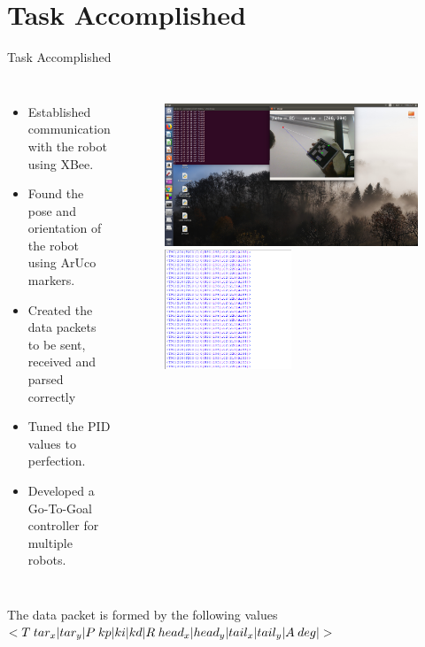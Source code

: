 \documentclass[10pt,a4paper]{beamer}
\begin{document}
\section{Task Accomplished}
\begin{frame}{Task Accomplished}
\begin{columns}
	\begin{itemize}
		\item Established communication with the robot using XBee.\pause
		\item Found the pose and orientation of the robot using ArUco markers.\pause
		\item Created the data packets to be sent, received and parsed correctly\pause
		\item Tuned the PID values to perfection.\pause
		\item Developed a Go-To-Goal controller for multiple robots.\pause
		
	\end{itemize}
	
\begin{figure}
\includegraphics[height=0.35\textheight]{Screenshot_org.png}\pause\vspace{1 em}
\includegraphics[height=0.25\textheight, width=0.5\textwidth]{xbee_packet.png}

\end{figure}	
\end{columns}
\vspace{0.7 em}\pause
The data packet is formed by the following values
\small{$<T\hspace{0.25 em}tar_x|tar_y|P\hspace{0.25 em}kp|ki|kd|R\hspace{0.25 em}head_x|head_y|tail_x|tail_y|A\hspace{0.25 em}deg|>$}
\end{frame}
\end{document}
